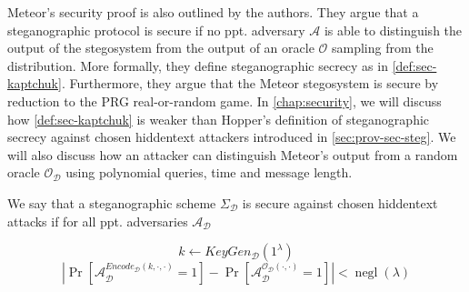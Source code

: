 Meteor's security proof is also outlined by the authors.
They argue that a steganographic protocol is secure if no ppt. adversary $\mathcal{A}$ is able to distinguish the output of the stegosystem from the output of an oracle $\mathcal{O}$ sampling from the distribution.
More formally, they define steganographic secrecy as in \autoref{def:sec-kaptchuk}.
Furthermore, they argue that the Meteor stegosystem is secure by reduction to the PRG real-or-random game. 
In \autoref{chap:security}, we will discuss how \autoref{def:sec-kaptchuk} is weaker than Hopper's definition of steganographic secrecy against chosen hiddentext attackers introduced in \autoref{sec:prov-sec-steg}.
We will also discuss how an attacker can distinguish Meteor's output from a random oracle $\mathcal{O}_{\mathcal{D}}$ using polynomial queries, time and message length.

\begin{definition}%
	\label{def:sec-kaptchuk}%
	We say that a steganographic scheme $\Sigma_{\mathcal{D}}$ is secure against chosen hiddentext attacks if for all ppt. adversaries $\mathcal{A}_{\mathcal{D}}$
	
	$$k \leftarrow KeyGen_{\mathcal{D}}(1^\lambda)$$
	$$\left| \mathop{Pr}\left[ \mathcal{A}_{\mathcal{D}}^{Encode_{\mathcal{D}}(k, \cdot, \cdot)}=1 \right] - \mathop{Pr}\left[ \mathcal{A}_{\mathcal{D}}^{\mathcal{O}_{\mathcal{D}}(\cdot, \cdot)}=1 \right] \right| < \mathop{negl}(\lambda)$$
\end{definition}
